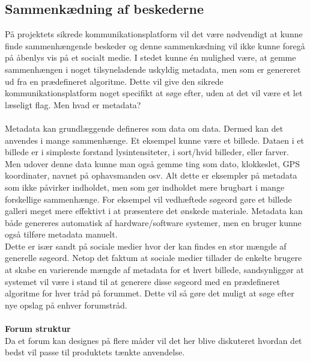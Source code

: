 
\subsection{Sammenkædning af beskederne}
På projektets sikrede kommunikationsplatform vil det være nødvendigt at kunne finde sammenhængende beskeder og denne sammenkædning vil ikke kunne foregå på åbenlys vis på et socialt medie. I stedet kunne én mulighed være, at gemme sammenhængen i noget tilsyneladende uskyldig metadata, men som er genereret ud fra en prædefineret algoritme. Dette vil give den sikrede kommunikationsplatform noget specifikt at søge efter, uden at det vil være et let læseligt flag. Men hvad er metadata?\\\\
Metadata kan grundlæggende defineres som data om data. Dermed kan det anvendes i mange sammenhænge. Et eksempel kunne være et billede. Dataen i et billede er i simpleste forstand lysintensiteter, i sort/hvid billeder, eller farver. Men udover denne data kunne man også gemme ting som dato, klokkeslet, GPS koordinater, navnet på ophavsmanden osv. Alt dette er eksempler på metadata som ikke påvirker indholdet, men som gør indholdet mere brugbart i mange forskellige sammenhænge. For eksempel vil vedhæftede søgeord gøre et billede galleri meget mere effektivt i at præsentere det ønskede materiale. Metadata kan både genereres automatisk af hardware/software systemer, men en bruger kunne også tilføre metadata manuelt.\\ Dette er især sandt på sociale medier hvor der kan findes en stor mængde af generelle søgeord. Netop det faktum at sociale medier tillader de enkelte brugere at skabe en varierende mængde af metadata for et hvert billede, sandsynliggør at systemet vil være i stand til at generere disse søgeord med en prædefineret algoritme for hver tråd på forummet. Dette vil så gøre det muligt at søge efter nye opslag på enhver forumstråd.
\\\\
\textbf{Forum struktur}\\
Da et forum kan designes på flere måder vil det her blive diskuteret hvordan det bedst vil passe til produktets tænkte anvendelse.

